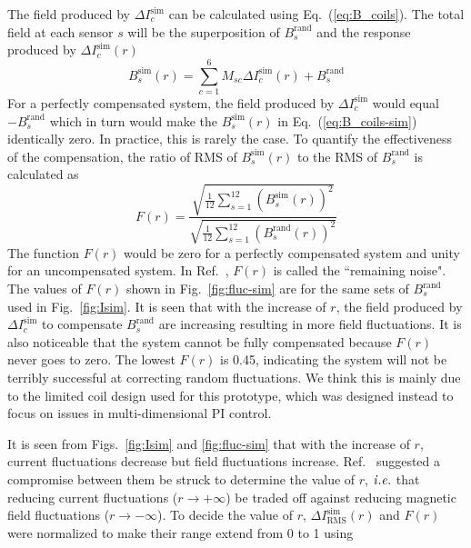 The field produced by $ \Delta I_c^{\text{sim}}$ can be calculated using Eq.~(\ref{eq:B_coils}). The total field at each sensor $s$ will be the superposition of $B_s^{\text{rand}}$ and the response produced by $ \Delta I_c^{\text{sim}}(r)$ 
\begin{equation}\label{eq:B_coils-sim}
    B_s^{\text{sim}}(r) =\sum_{c=1}^6 M_{sc} \Delta I_c^{\text{sim}}(r) + B_s^{\text{rand}}
\end{equation}
For a perfectly compensated system, the field produced by $ \Delta I_c^{\text{sim}}$ would equal $- B_s^{\text{rand}}$ which in turn would make the $B_s^{\text{sim}}(r)$ in Eq.~(\ref{eq:B_coils-sim}) identically zero. In practice, this is rarely the case. To quantify the effectiveness of the compensation,  the ratio of RMS of $B_s^{\text{sim}}(r)$ to the RMS of $B_s^{\text{rand}}$ is calculated as
\begin{equation}\label{eq:fluc}
    F(r)=\frac{\sqrt{\frac{1}{12} \sum_{s=1}^{12} (B_s^{\text{sim}}(r))^2}}{\sqrt{\frac{1}{12} \sum_{s=1}^{12} (B_s^{\text{rand}}(r))^2}}
\end{equation}
The function $F(r)$ would be zero for a perfectly compensated system and unity for an uncompensated system. In Ref.~\cite{bea}, $F(r)$ is called the ``remaining noise". The values of $F(r)$ shown in Fig.~\ref{fig:fluc-sim} are for the same sets of $B_s^{\text{rand}}$ used in Fig.~\ref{fig:Isim}. It is seen that with the increase of $r$, the field produced by $\Delta I_c^{\text{sim}}$ to compensate $B_s^{\text{rand}}$  are increasing resulting in more field fluctuations. It is also noticeable that the system cannot be fully compensated because $F(r)$ never goes to zero. The lowest $F(r)$ is 0.45, indicating the system will not be terribly successful at correcting random fluctuations. We think this is mainly due to the limited coil design used for this prototype, which was designed instead to focus on issues in multi-dimensional PI control.


It is seen from Figs.~\ref{fig:Isim} and \ref{fig:fluc-sim} that with the increase of $r$, current fluctuations decrease but field fluctuations increase. Ref.~\cite{bea} suggested a compromise between them be struck to determine the value of $r$, $\it i.e.$ that reducing current fluctuations ($r \rightarrow + \infty$) be traded off against reducing magnetic field fluctuations ($r \rightarrow - \infty$). To decide the value of $r$, $\Delta I_{\text{RMS}}^{\text{sim}}(r)$ and $F(r)$ were normalized to make their range extend from 0 to 1 using

